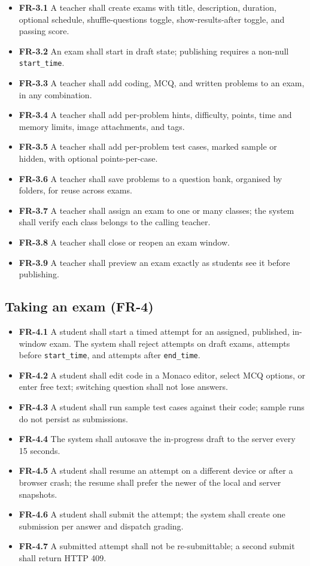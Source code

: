 \begin{itemize}
  \item \textbf{FR-3.1} A teacher shall create exams with title, description, duration, optional schedule, shuffle-questions toggle, show-results-after toggle, and passing score.
  \item \textbf{FR-3.2} An exam shall start in draft state; publishing requires a non-null \texttt{start\_time}.
  \item \textbf{FR-3.3} A teacher shall add coding, MCQ, and written problems to an exam, in any combination.
  \item \textbf{FR-3.4} A teacher shall add per-problem hints, difficulty, points, time and memory limits, image attachments, and tags.
  \item \textbf{FR-3.5} A teacher shall add per-problem test cases, marked sample or hidden, with optional points-per-case.
  \item \textbf{FR-3.6} A teacher shall save problems to a question bank, organised by folders, for reuse across exams.
  \item \textbf{FR-3.7} A teacher shall assign an exam to one or many classes; the system shall verify each class belongs to the calling teacher.
  \item \textbf{FR-3.8} A teacher shall close or reopen an exam window.
  \item \textbf{FR-3.9} A teacher shall preview an exam exactly as students see it before publishing.
\end{itemize}

\subsection{Taking an exam (FR-4)}

\begin{itemize}
  \item \textbf{FR-4.1} A student shall start a timed attempt for an assigned, published, in-window exam. The system shall reject attempts on draft exams, attempts before \texttt{start\_time}, and attempts after \texttt{end\_time}.
  \item \textbf{FR-4.2} A student shall edit code in a Monaco editor, select MCQ options, or enter free text; switching question shall not lose answers.
  \item \textbf{FR-4.3} A student shall run sample test cases against their code; sample runs do not persist as submissions.
  \item \textbf{FR-4.4} The system shall autosave the in-progress draft to the server every 15 seconds.
  \item \textbf{FR-4.5} A student shall resume an attempt on a different device or after a browser crash; the resume shall prefer the newer of the local and server snapshots.
  \item \textbf{FR-4.6} A student shall submit the attempt; the system shall create one submission per answer and dispatch grading.
  \item \textbf{FR-4.7} A submitted attempt shall not be re-submittable; a second submit shall return HTTP 409.
\end{itemize}

